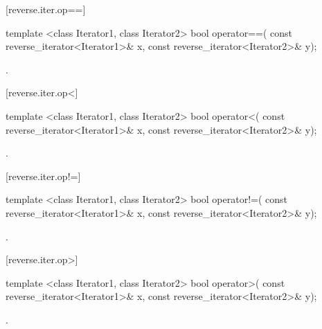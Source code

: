 [reverse.iter.op==]{}

%
\begin{itemdecl}
template <class Iterator1, class Iterator2>
  bool operator==(
    const reverse_iterator<Iterator1>& x,
    const reverse_iterator<Iterator2>& y);
\end{itemdecl}

\begin{itemdescr}
\pnum
\returns
{}.
\end{itemdescr}

[reverse.iter.op<]{}

%
\begin{itemdecl}
template <class Iterator1, class Iterator2>
  bool operator<(
    const reverse_iterator<Iterator1>& x,
    const reverse_iterator<Iterator2>& y);
\end{itemdecl}

\begin{itemdescr}
\pnum
\returns
{}.
\end{itemdescr}

[reverse.iter.op!=]{}

%
\begin{itemdecl}
template <class Iterator1, class Iterator2>
  bool operator!=(
    const reverse_iterator<Iterator1>& x,
    const reverse_iterator<Iterator2>& y);
\end{itemdecl}

\begin{itemdescr}
\pnum
\returns
{}.
\end{itemdescr}

[reverse.iter.op>]{}

%
\begin{itemdecl}
template <class Iterator1, class Iterator2>
  bool operator>(
    const reverse_iterator<Iterator1>& x,
    const reverse_iterator<Iterator2>& y);
\end{itemdecl}

\begin{itemdescr}
\pnum
\returns
{}.
\end{itemdescr}

